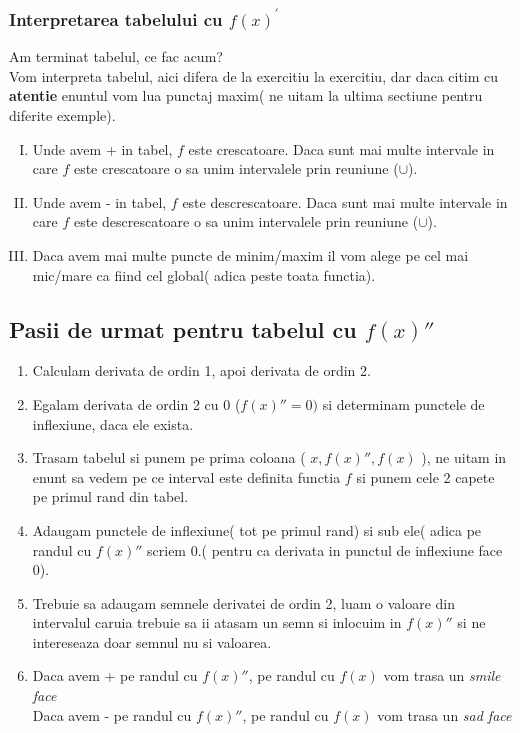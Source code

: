 \documentclass[11pt]{article}
\begin{document}
\begin{flushleft}
    \subsubsection*{Interpretarea tabelului cu $f(x)^\prime$}
    \qquad Am terminat tabelul, ce fac acum? \\
    \qquad Vom interpreta tabelul, aici difera de la exercitiu la exercitiu, dar daca citim cu 
            \textbf{atentie} enuntul vom lua punctaj maxim( ne uitam la ultima sectiune pentru diferite 
            exemple).
    \begin{enumerate}[I.]
        \item   Unde avem + in tabel, $f$ este crescatoare. Daca sunt mai multe intervale in care $f$ este
                crescatoare o sa unim intervalele prin reuniune ($\cup$).
        \item   Unde avem - in tabel, $f$ este descrescatoare. Daca sunt mai multe intervale in care $f$
                este descrescatoare o sa unim intervalele prin reuniune ($\cup$).
        \item   Daca avem mai multe puncte de minim/maxim il vom alege pe cel mai mic/mare ca fiind cel
                global( adica peste toata functia).
        
    \end{enumerate}

    \subsection*{Pasii de urmat pentru tabelul cu $f(x)''$}
        \begin{enumerate}[1).]
            \item   Calculam derivata de ordin 1, apoi derivata de ordin 2.
            \item   Egalam derivata de ordin 2 cu 0 ($f(x)'' = 0)$ si determinam punctele de inflexiune, 
                    daca ele exista.
            \item   Trasam tabelul si punem pe prima coloana ( $x, f(x)'', f(x)$ ), ne uitam in enunt
                    sa vedem pe ce interval este definita functia $f$ si punem cele 2 capete pe primul rand
                    din tabel.
            \item   Adaugam punctele de inflexiune( tot pe primul rand) si sub ele( adica pe randul cu  
                    $f(x)''$ scriem 0.( pentru ca derivata in punctul de inflexiune face 0).
            \item   Trebuie sa adaugam semnele derivatei de ordin 2, luam o valoare din intervalul caruia
                    trebuie sa ii atasam un semn si inlocuim in $f(x)''$ si ne intereseaza doar semnul nu
                    si valoarea.
            \item   Daca avem + pe randul cu $f(x)''$, pe randul cu $f(x)$ vom trasa un \textit{smile face} 
                    \\
                    Daca avem - pe randul cu $f(x)''$, pe randul cu $f(x)$ vom trasa un \textit{sad face} 
                    
        \end{enumerate}
    
\end{flushleft}
\newpage
\end{document}
